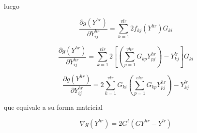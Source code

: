 luego



$$\frac{\partial g (Y^{hr})}{\partial Y_{ij}^{hr}} = \sum_{k=1}^{vlr} 2 f_{kj}(Y^{hr})G_{ki}$$


$$\frac{\partial g (Y^{hr})}{\partial Y_{ij}^{hr}} = \sum_{k=1}^{vlr} 2 [(\sum_{p=1}^{vhr} G_{kp} 
Y_{pj}^{hr}) - Y_{kj}^{lr}] G_{ki}$$



$$\frac{\partial g (Y^{hr})}{\partial Y_{ij}^{hr}} = 2 \sum_{k=1}^{vlr} G_{ki} (\sum_{p=1}^{vhr} 
G_{kp} 
Y_{pj}^{hr}) - Y_{kj}^{lr}$$



que equivale a su forma matricial


$$\nabla g (Y^{hr}) = 2 G^t(G Y^{hr}-Y^{lr})$$

